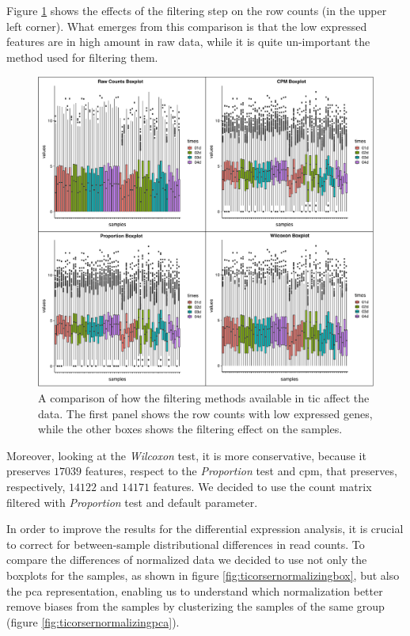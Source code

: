 Figure \ref{fig:ticorserfiltering} shows the effects of the filtering step on the row counts (in the upper left corner). 
What emerges from this comparison is that the low expressed features are in high amount in raw data, while it is quite un-important the method used for filtering them.

\begin{figure}[H]
\includegraphics[width=\textwidth,height=\textheight,keepaspectratio]{img/ticorser/filtering/panel1.pdf}
\caption[ticorser filtering methods]{A comparison of how the filtering methods available in \gls{tic} affect the data.
The first panel shows the row counts with low expressed genes, while the other boxes shows the filtering effect on the samples.}
\label{fig:ticorserfiltering}
\centering
\end{figure}

Moreover, looking at the \textit{Wilcoxon} test, it is more conservative, because it preserves $17039$ features, respect to the \textit{Proportion} test and \gls{cpm}, that preserves, respectively, $14122$ and $14171$ features.
We decided to use the count matrix filtered with \textit{Proportion} test and default parameter.  

In order to improve the results for the differential expression analysis, it is crucial to correct for between-sample distributional differences in read counts.
To compare the differences of normalized data we decided to use not only the boxplots for the samples, as shown in  figure \ref{fig:ticorsernormalizingbox}, but also the \gls{pca} representation, enabling us to understand which normalization better remove biases from the samples by clusterizing the samples of the same group (figure \ref{fig:ticorsernormalizingpca}).

